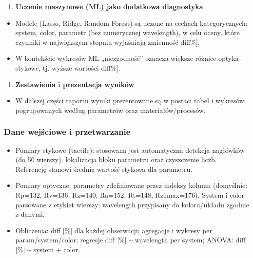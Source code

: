\documentclass[
  10pt,
]{article}
\providecommand{\tightlist}{%
  \setlength{\itemsep}{0pt}\setlength{\parskip}{0pt}}
\begin{document}
\begin{enumerate}
\def\labelenumi{\arabic{enumi}.}
\setcounter{enumi}{7}
\tightlist
\item
  \textbf{Uczenie maszynowe (ML) jako dodatkowa diagnostyka}
\end{enumerate}

\begin{itemize}
\tightlist
\item
  Modele (Lasso, Ridge, Random Forest) są uczone na cechach
  kategorycznych: system, color, parametr (bez numerycznej wavelength),
  w celu oceny, które czynniki w największym stopniu wyjaśniają
  zmienność \textbar diff\textbar{[}\%{]}.
\item
  W kontekście wykresów ML „niezgodność'' oznacza większe różnice
  optyka--stykowe, tj. wyższe wartości \textbar diff\textbar{[}\%{]}.
\end{itemize}

\begin{enumerate}
\def\labelenumi{\arabic{enumi}.}
\setcounter{enumi}{8}
\tightlist
\item
  \textbf{Zestawienia i prezentacja wyników}
\end{enumerate}

\begin{itemize}
\tightlist
\item
  W dalszej części raportu wyniki prezentowane są w postaci tabel i
  wykresów pogrupowanych według parametrów oraz materiałów/procesów.
\end{itemize}

\subsubsection{Dane wejściowe i
przetwarzanie}\label{dane-wejux15bciowe-i-przetwarzanie}

\begin{itemize}
\tightlist
\item
  Pomiary stykowe (tactile): stosowana jest automatyczna detekcja
  nagłówków (do 50 wierszy), lokalizacja bloku parametru oraz
  czyszczenie liczb. Referencję stanowi średnia wartość stykowa dla
  parametru.
\item
  Pomiary optyczne: parametry zdefiniowane przez indeksy kolumn
  (domyślnie: Rp=132, Rv=136, Rz=140, Ra=152, Rt=148, Rz1max=176).
  System i color parsowane z etykiet wierszy; wavelength przypisany do
  koloru/układu zgodnie z danymi.
\item
  Obliczenia: \textbar diff\textbar{} {[}\%{]} dla każdej obserwacji;
  agregacje i wykresy per param/system/color; regresje
  \textbar diff\textbar{} {[}\%{]} \textasciitilde{} wavelength per
  system; ANOVA: \textbar diff\textbar{} {[}\%{]} \textasciitilde{}
  system + color.
\end{itemize}
\end{document}
